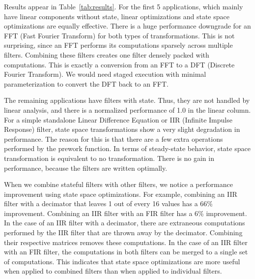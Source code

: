Results appear in Table~\ref{tab:results}.  For the first 5
applications, which mainly have linear components without state,
linear optimizations and state space optimizations are equally
effective. There is a huge performance downgrade for an FFT (Fast
Fourier Transform) for both types of transformations. This is not
surprising, since an FFT performs its computations sparsely across
multiple filters. Combining these filters creates one filter densely
packed with computations. This is exactly a conversion from an FFT to
a DFT (Discrete Fourier Transform).  We would need staged execution
with minimal parameterization to convert the DFT back to an FFT.

The remaining applications have filters with state.  Thus, they are
not handled by linear analysis, and there is a normalized performance
of 1.0 in the linear column.  For a simple standalone Linear
Difference Equation or IIR (Infinite Impulse Response) filter,
state space transformations show a very slight degradation in
performance. The reason for this is that there are a few extra
operations performed by the prework function. In terms of steady-state
behavior, state space transformation is equivalent to no
transformation. There is no gain in performance, because the filters
are written optimally.

When we combine stateful filters with other filters, we notice a
performance improvement using state space optimizations. For example,
combining an IIR filter with a decimator that leaves 1 out of every 16
values has a 66\% improvement. Combining an IIR filter with an FIR
filter has a 6\% improvement. In the case of an IIR filter with a
decimator, there are extraneous computations performed by the IIR
filter that are thrown away by the decimator.  Combining their
respective matrices removes these computations. In the case of an IIR
filter with an FIR filter, the computations in both filters can be
merged to a single set of computations. This indicates that
state space optimizations are more useful when applied to combined
filters than when applied to individual filters.
